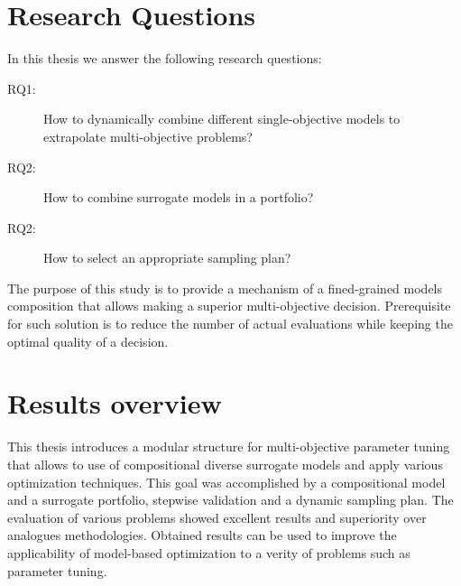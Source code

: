 \section{Research Questions}

In this thesis we answer the following research questions:
\begin{description} 
    \item[RQ1:]\label{RG1} How to dynamically combine different single-objective models to extrapolate multi-objective problems?
    \item[RQ2:]\label{RG2} How to combine surrogate models in a portfolio?
    \item[RQ2:]\label{RG3} How to select an appropriate sampling plan?
\end{description}

The purpose of this study is to provide a mechanism of a fined-grained models composition that allows making a superior multi-objective decision. Prerequisite for such solution is to reduce the number of actual evaluations while keeping the optimal quality of a decision.

\section{Results overview}
    This thesis introduces a modular structure for multi-objective parameter tuning that allows to use of compositional diverse surrogate models and apply various optimization techniques. This goal was accomplished by a compositional model and a surrogate portfolio, stepwise validation and a dynamic sampling plan. The evaluation of various problems showed excellent results and superiority over analogues methodologies. Obtained results can be used to improve the applicability of model-based optimization to a verity of problems such as parameter tuning.
    




